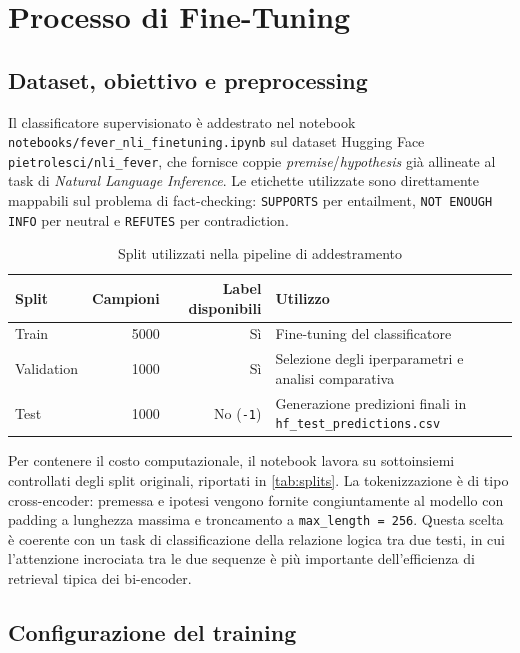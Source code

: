 \documentclass[10pt,a4paper]{article}
\begin{document}
\section{Processo di Fine-Tuning}

\subsection{Dataset, obiettivo e preprocessing}

Il classificatore supervisionato è addestrato nel notebook \texttt{notebooks/fever\_nli\_finetuning.ipynb} sul dataset Hugging Face \texttt{pietrolesci/nli\_fever}, che fornisce coppie \textit{premise}/\textit{hypothesis} già allineate al task di \textit{Natural Language Inference}. Le etichette utilizzate sono direttamente mappabili sul problema di fact-checking: \texttt{SUPPORTS} per entailment, \texttt{NOT ENOUGH INFO} per neutral e \texttt{REFUTES} per contradiction.

\begin{table}[t]
  \centering
  \caption{Split utilizzati nella pipeline di addestramento}
  \label{tab:splits}
  \small
  \begin{tabular}{lrrl}
    \toprule
    Split & Campioni & Label disponibili & Utilizzo \\
    \midrule
    Train & 5000 & Sì & Fine-tuning del classificatore \\
    Validation & 1000 & Sì & Selezione degli iperparametri e analisi comparativa \\
    Test & 1000 & No (\texttt{-1}) & Generazione predizioni finali in \texttt{hf\_test\_predictions.csv} \\
    \bottomrule
  \end{tabular}
\end{table}

Per contenere il costo computazionale, il notebook lavora su sottoinsiemi controllati degli split originali, riportati in \autoref{tab:splits}. La tokenizzazione è di tipo cross-encoder: premessa e ipotesi vengono fornite congiuntamente al modello con padding a lunghezza massima e troncamento a \texttt{max\_length = 256}. Questa scelta è coerente con un task di classificazione della relazione logica tra due testi, in cui l'attenzione incrociata tra le due sequenze è più importante dell'efficienza di retrieval tipica dei bi-encoder.

\subsection{Configurazione del training}
\end{document}
